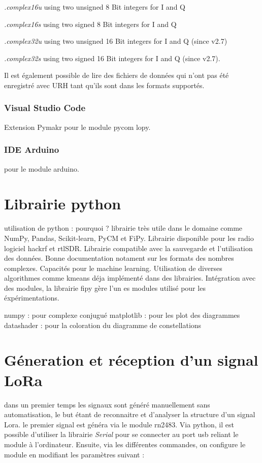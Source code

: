 \textit{.complex16u} using two unsigned 8 Bit integers for I and Q

\textit{.complex16s} using two signed 8 Bit integers for I and Q

\textit{.complex32u} using two unsigned 16 Bit integers for I and Q (since v2.7)

\textit{.complex32s} using two signed 16 Bit integers for I and Q (since v2.7).

Il est également possible de lire des fichiers de données qui n'ont pas été enregistré avec URH tant qu'ils sont dans les formats supportés.

\subsubsection{Visual Studio Code}

Extension Pymakr pour le module pycom lopy.


\subsubsection{IDE Arduino}

pour le module arduino.

\section{Librairie python}

utilisation de python : pourquoi ?
librairie très utile dans le domaine comme NumPy, Pandas, Scikit-learn, PyCM et FiPy.
Librairie disponible pour les radio logiciel hackrf et rtlSDR.
Librairie compatible avec la sauvegarde et l'utilisation des données. Bonne documentation notament sur les formats des nombres complexes.
Capacités pour le machine learning. Utilisation de diverses algorithmes comme kmeans déja implémenté dans des librairies.
Intégration avec des modules, la librairie fipy gère l'un es modules utilisé pour les éxpérimentations.

numpy : pour complexe conjugué
matplotlib : pour les plot des diagrammes
datashader : pour la coloration du diagramme de constellations


\section{Géneration et réception d'un signal LoRa} \label{signallora}

dans un premier temps les signaux sont généré manuellement sans automatisation, le but étant de reconnaitre et d'analyser la structure d'un signal Lora. le premier signal est généra via le module rn2483. Via python, il est possible d'utiliser la librairie \textit{Serial} pour se connecter au port usb reliant le module à l'ordinateur. Ensuite, via les différentes commandes, on configure le module en modifiant les paramètres suivant : 

